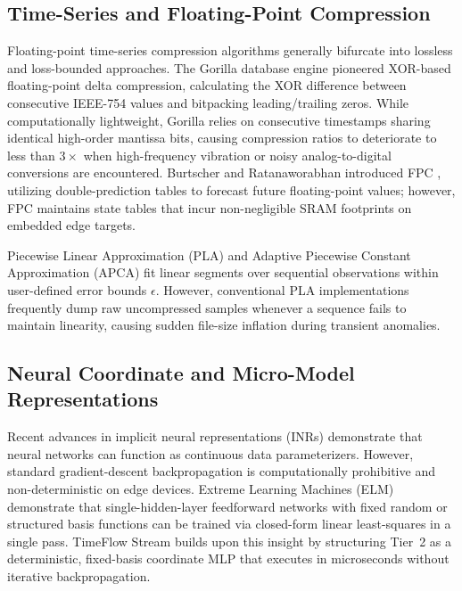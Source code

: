 \documentclass[journal]{IEEEtran}
\begin{document}
\subsection{Time-Series and Floating-Point Compression}
Floating-point time-series compression algorithms generally bifurcate into lossless and loss-bounded approaches. The Gorilla database engine \cite{pelkonen2015gorilla} pioneered XOR-based floating-point delta compression, calculating the XOR difference between consecutive IEEE-754 values and bitpacking leading/trailing zeros. While computationally lightweight, Gorilla relies on consecutive timestamps sharing identical high-order mantissa bits, causing compression ratios to deteriorate to less than $3\times$ when high-frequency vibration or noisy analog-to-digital conversions are encountered. Burtscher and Ratanaworabhan introduced FPC \cite{buragohain2007fpc}, utilizing double-prediction tables to forecast future floating-point values; however, FPC maintains state tables that incur non-negligible SRAM footprints on embedded edge targets.

Piecewise Linear Approximation (PLA) and Adaptive Piecewise Constant Approximation (APCA) \cite{keogh2001segmentation} fit linear segments over sequential observations within user-defined error bounds $\epsilon$. However, conventional PLA implementations frequently dump raw uncompressed samples whenever a sequence fails to maintain linearity, causing sudden file-size inflation during transient anomalies.

\subsection{Neural Coordinate and Micro-Model Representations}
Recent advances in implicit neural representations (INRs) demonstrate that neural networks can function as continuous data parameterizers. However, standard gradient-descent backpropagation is computationally prohibitive and non-deterministic on edge devices. Extreme Learning Machines (ELM) \cite{huang2006extreme} demonstrate that single-hidden-layer feedforward networks with fixed random or structured basis functions can be trained via closed-form linear least-squares in a single pass. TimeFlow Stream builds upon this insight by structuring Tier~2 as a deterministic, fixed-basis coordinate MLP that executes in microseconds without iterative backpropagation.
\end{document}
